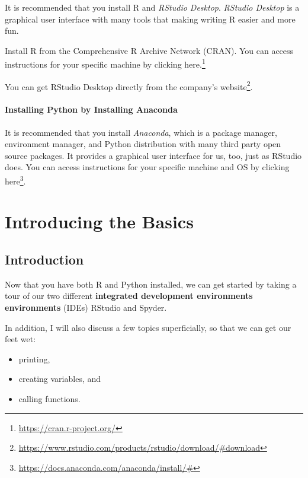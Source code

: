 \documentclass[
  12pt,
  krantz2]{krantz}
\providecommand{\tightlist}{%
  \setlength{\itemsep}{0pt}\setlength{\parskip}{0pt}}
\renewcommand{\href}[2]{#2\footnote{\url{#1}}}
\begin{document}
It is recommended that you install R and \emph{RStudio Desktop}. \emph{RStudio Desktop} is a graphical user interface with many tools that making writing R easier and more fun.

Install R from the Comprehensive R Archive Network (CRAN). You can access instructions for your specific machine by clicking \href{https://cran.r-project.org/}{here.}

You can get RStudio Desktop directly from the \href{https://www.rstudio.com/products/rstudio/download/\#download}{company's website}.

\hypertarget{installing-python-by-installing-anaconda}{%
\subsection*{Installing Python by Installing Anaconda}\label{installing-python-by-installing-anaconda}}


It is recommended that you install \emph{Anaconda}, which is a package manager, environment manager, and Python distribution with many third party open source packages. It provides a graphical user interface for us, too, just as RStudio does. You can access instructions for your specific machine and OS by clicking \href{https://docs.anaconda.com/anaconda/install/\#}{here}.

\mainmatter

\hypertarget{part-introducing-the-basics}{%
\part{Introducing the Basics}\label{part-introducing-the-basics}}

\hypertarget{intro}{%
\chapter{Introduction}\label{intro}}

Now that you have both R and Python installed, we can get started by taking a tour of our two different \textbf{integrated development environments environments} (IDEs) RStudio and Spyder.

In addition, I will also discuss a few topics superficially, so that we can get our feet wet:

\begin{itemize}
\tightlist
\item
  printing,
\item
  creating variables, and
\item
  calling functions.
\end{itemize}
\end{document}

